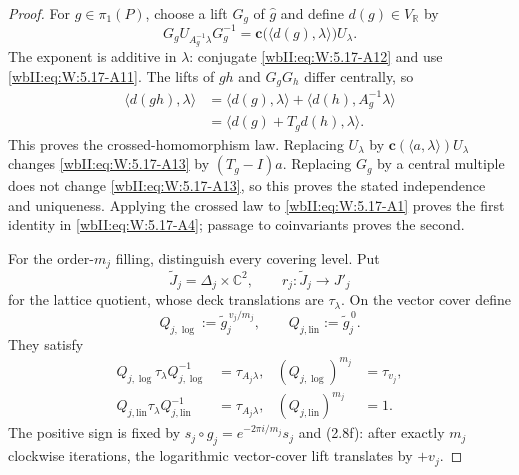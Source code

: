 \begin{proof}
For \(g\in\pi_1(P)\), choose a lift \(G_g\) of \(\widehat g\) and define
\(d(g)\in V_{\mathbb R}\) by
\[
 G_gU_{A_g^{-1}\lambda}G_g^{-1}
 =\mathbf c\bigl(\langle d(g),\lambda\rangle\bigr)U_\lambda.
\tag{W.105}\label{wbII:eq:W:5.17-A13}
\]
The exponent is additive in \(\lambda\): conjugate \eqref{wbII:eq:W:5.17-A12} and use
\eqref{wbII:eq:W:5.17-A11}.  The lifts of \(gh\) and \(G_gG_h\) differ centrally, so
\[
\begin{aligned}
 \langle d(gh),\lambda\rangle
 &=\langle d(g),\lambda\rangle
   +\langle d(h),A_g^{-1}\lambda\rangle\\
 &=\langle d(g)+T_gd(h),\lambda\rangle.
\end{aligned}
\]
This proves the crossed-homomorphism law.  Replacing
\(U_\lambda\) by
\(\mathbf c(\langle a,\lambda\rangle)U_\lambda\) changes \eqref{wbII:eq:W:5.17-A13} by
\((T_g-I)a\).  Replacing \(G_g\) by a central multiple does not change
\eqref{wbII:eq:W:5.17-A13}, so this proves the stated independence and uniqueness.  Applying
the crossed law to
\eqref{wbII:eq:W:5.17-A1} proves the first identity in \eqref{wbII:eq:W:5.17-A4}; passage to coinvariants
proves the second.

For the order-\(m_j\) filling, distinguish every covering level.  Put
\[
 \widetilde J_j=\Delta_j\times\mathbb C^2,\qquad
 r_j:\widetilde J_j\longrightarrow J'_j
\]
for the lattice quotient, whose deck translations are \(\tau_\lambda\).
On the vector cover define
\[
 Q_{j,\log}:=\widetilde g_j^{\,v_j/m_j},\qquad
 Q_{j,\mathrm{lin}}:=\widetilde g_j^{\,0}.
\]
They satisfy
\[
\begin{aligned}
 Q_{j,\log}\tau_\lambda Q_{j,\log}^{-1}
  &=\tau_{A_j\lambda},&
 (Q_{j,\log})^{m_j}&=\tau_{v_j},\\
 Q_{j,\mathrm{lin}}\tau_\lambda Q_{j,\mathrm{lin}}^{-1}
  &=\tau_{A_j\lambda},&
 (Q_{j,\mathrm{lin}})^{m_j}&=1.
\end{aligned}
\tag{W.106}\label{wbII:eq:W:5.17-A14}
\]
The positive sign is fixed by
\(s_j\circ g_j=e^{-2\pi i/m_j}s_j\) and (2.8f): after exactly
\(m_j\) clockwise iterations, the logarithmic vector-cover lift translates
by \(+v_j\).


\end{proof}
